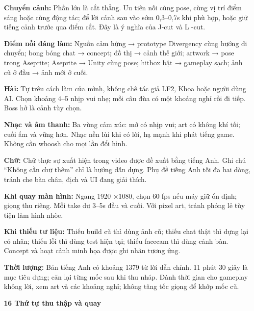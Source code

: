\documentclass[10pt,a4paper]{article}
\begin{document}
\textbf{Chuyển cảnh:}  Phần lớn là cắt thẳng. Ưu tiên nối cùng pose, cùng vị trí điểm sáng hoặc cùng động tác; để lời cảnh sau vào sớm 0,3–0,7s khi phù hợp, hoặc giữ tiếng cảnh trước qua điểm cắt. Đây là ý nghĩa của J-cut và L -cut.\par

\textbf{Điểm nối đáng làm:}  Nguồn cảm hứng → prototype Divergency cùng hướng di chuyển; bong bóng chat → concept; đồ thị → cảnh thế giới; artwork → pose trong Aseprite; Aseprite → Unity cùng pose; hitbox bật → gameplay sạch; ảnh cũ ở đầu → ảnh mới ở cuối.\par

\textbf{Hài:}  Tự trêu cách làm của mình, không chê tác giả LF2, Khoa hoặc người dùng AI. Chọn khoảng 4–5 nhịp vui nhẹ; mỗi câu đùa có một khoảng nghỉ rồi đi tiếp. Boss hở là cảnh tùy chọn.\par

\textbf{Nhạc và âm thanh:}  Ba vùng cảm xúc: mở có nhịp vui; art có không khí tối; cuối ấm và vững hơn. Nhạc nền lùi khi có lời, hạ mạnh khi phát tiếng game. Không cần whoosh cho mọi lần đổi hình.\par

\textbf{Chữ:}  Chữ thực sự xuất hiện trong video được đề xuất bằng tiếng Anh. Ghi chú “Không cần chữ thêm” chỉ là hướng dẫn dựng. Phụ đề tiếng Anh tối đa hai dòng, tránh che bàn chân, địch và UI đang giải thích.\par

\textbf{Khi quay màn hình:}  Ngang 1920 ×1080, chọn 60 fps nếu máy giữ ổn định; giọng thu riêng. Mỗi take dư 3–5s đầu và cuối. Với pixel art, tránh phóng lẻ tùy tiện làm hình nhòe.\par

\textbf{Khi thiếu tư liệu:}  Thiếu build cũ thì dùng ảnh cũ; thiếu chat thật thì dựng lại có nhãn; thiếu lỗi thì dùng test hiện tại; thiếu facecam thì dùng cảnh bàn. Concept và hoạt cảnh minh họa được ghi nhãn tương ứng.\par

\textbf{Thời lượng:}  Bản tiếng Anh có khoảng 1379 từ lời dẫn chính. 11 phút 30 giây là mục tiêu dựng; căn lại từng mốc sau khi thu nháp. Dành thời gian cho gameplay không lời, xem art và các khoảng nghỉ; không tăng tốc giọng để khớp mốc cũ.\par

\clearpage

\textbf{16 Thứ tự thu thập và quay}\par
\end{document}
